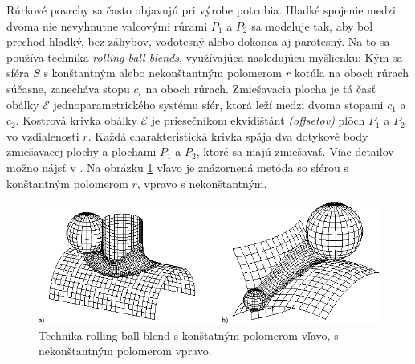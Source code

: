 Rúrkové povrchy sa často objavujú pri výrobe potrubia. Hladké spojenie medzi dvoma nie nevyhnutne valcovými rúrami $P_1$ a $P_2$ sa modeluje tak, aby bol prechod hladký, bez záhybov, vodotesný alebo dokonca aj parotesný. Na to sa používa technika \textit{rolling ball blends}, využívajúca nasledujúcu myšlienku: Kým sa sféra $S$ s konštantným alebo nekonštantným polomerom $r$ kotúľa na oboch rúrach súčasne, zanecháva stopu $c_i$ na oboch rúrach. Zmiešavacia plocha je tá časť obálky $\mathcal{E}$ jednoparametrického systému sfér, ktorá leží medzi dvoma stopami $c_1$ a $c_2$. Kostrová krivka obálky $\mathcal{E}$ je priesečníkom ekvidištánt \textit{(offsetov)} plôch $P_1$ a $P_2$ vo vzdialenosti $r$. Každá charakteristická krivka spája dva dotykové body zmiešavacej plochy a plochami $P_1$ a $P_2$, ktoré sa majú zmiešavať. Viac detailov možno nájsť v \cite{Ode20}. Na obrázku \ref{fig:rolling_ball_blends} vľavo je znázornená metóda so sférou s konštantným polomerom $r$, vpravo s nekonštantným.

\begin{figure}[H]
	\centering
	\includegraphics[width=\textwidth]{images/rolling_ball_blends.png}
	\caption[Technika rolling ball blends.]{Technika rolling ball blend s konštatným polomerom vľavo, s nekonštantným polomerom vpravo. \cite{Rollingballblends}}
	\label{fig:rolling_ball_blends}
\end{figure}
